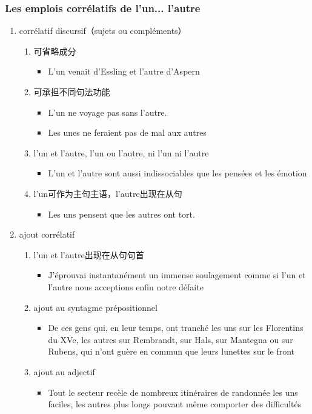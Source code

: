 \documentclass[UTF8]{report}
\begin{document}
\subsubsection{Les emplois corrélatifs de l’un... l’autre}
\begin{enumerate}
    \item corrélatif discursif（sujets ou compléments）
    \begin{enumerate}
        \item 可省略成分
        \begin{itemize}
            \item L’un venait d’Essling et l’autre d’Aspern
        \end{itemize}
        \item 可承担不同句法功能
        \begin{itemize}
            \item L’un ne voyage pas sans l’autre.
            \item Les unes ne feraient pas de mal aux autres
        \end{itemize}
        \item l’un et l’autre, l’un ou l’autre, ni l’un ni l’autre
       \begin{itemize}
        \item L’un et l’autre sont aussi indissociables que les pensées et les émotion 
       \end{itemize}
       \item l'un可作为主句主语，l'autre出现在从句
       \begin{itemize}
        \item Les uns pensent que les autres ont tort.
       \end{itemize}
    \end{enumerate}
    \item ajout corrélatif
    \begin{enumerate}
        \item l’un et l’autre出现在从句句首
        \begin{itemize}
            \item J’éprouvai instantanément un immense soulagement comme si l’un et l’autre nous acceptions enfin notre défaite
        \end{itemize}
        \item ajout au syntagme prépositionnel 
        \begin{itemize}
            \item De ces gens qui, en leur temps, ont tranché les uns sur les Florentins du XVe, les autres sur Rembrandt, sur Hals, sur Mantegna ou sur Rubens, qui n’ont guère en commun que leurs lunettes sur le front
        \end{itemize}
        \item ajout au adjectif
        \begin{itemize}
            \item Tout le secteur recèle de nombreux itinéraires de randonnée les uns faciles, les autres plus longs pouvant même comporter des difficultés
        \end{itemize}
    \end{enumerate}
\end{enumerate}
\end{document}
